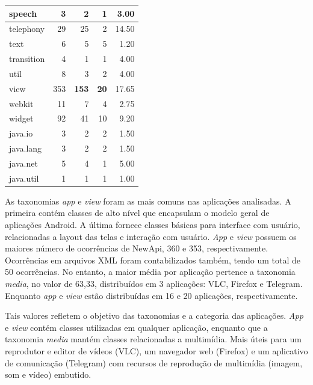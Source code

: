 \begin{table}[!htbp]
\begin{tabular}{| l | r | r | r | r |}
 	speech        	& 3 			& 2 			&   1 			& 3.00   \\ \hline
 	telephony       & 29 			& 25 			&   2 			& 14.50   \\ \hline
 	text        	& 6 			& 5 			&   5 			& 1.20   \\ \hline
 	transition 	 	& 4 			& 1 			&   1 			& 4.00   \\ \hline
 	util       	 	& 8				& 3 			&   2 			& 4.00   \\ \hline
 	view        	& 353 			& \textbf{153} 	&  \textbf{20} 	& 17.65   \\ \hline
 	webkit        	& 11 			& 7 			&  4 			& 2.75   \\ \hline
 	widget 			& 92			& 41 			&  10 			& 9.20   \\ \hline
 	java.io 		& 3				& 2 			&  2 			& 1.50   \\ \hline
 	java.lang 		& 3				& 2 			&  2 			& 1.50   \\ \hline
 	java.net 		& 5				& 4 			&  1 			& 5.00   \\ \hline
 	java.util 		& 1				& 1 			&  1 			& 1.00   \\ \hline
  \end{tabular}
  \label{tab:elementos_nova_api}
\end{table}

As taxonomias \textit{app} e \textit{view} foram as mais comuns nas aplicações analisadas.
A primeira contém classes de alto nível que encapsulam o modelo geral de aplicações Android.
A última fornece classes básicas para interface com usuário, relacionadas a layout das telas
e interação com usuário. \textit{App} e \textit{view} possuem os maiores número de ocorrências
de NewApi, 360 e 353, respectivamente. Ocorrências em arquivos XML foram contabilizados também,
tendo um total de 50 ocorrências. No entanto, a maior média por aplicação pertence a taxonomia
\textit{media}, no valor de 63,33, distribuídos em 3 aplicações:  VLC, Firefox e Telegram.
Enquanto \textit{app} e \textit{view} estão distribuídas em 16 e 20 aplicações, respectivamente.

Tais valores refletem o objetivo das taxonomias e a categoria das aplicações.
\textit{App} e \textit{view} contém classes utilizadas em qualquer aplicação, enquanto que a
taxonomia \textit{media} mantém classes relacionadas a multimídia. Mais úteis para um reprodutor
e editor de vídeos (VLC), um navegador web (Firefox) e um aplicativo de comunicação (Telegram)
com recursos de reprodução de multimídia (imagem, som e vídeo) embutido.

